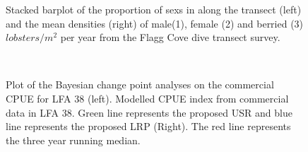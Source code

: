 \documentclass[11pt]{article}
\newcommand{\e}{\string~/bio.data/bio.lobster/figures/LFA3438Framework2019/} %
\begin{document}
\begin{landscape}
\begin{figure}
    \centering

       \caption{Stacked barplot of the proportion of sexs in along the transect (left) and the mean densities (right) of male(1), female (2) and berried (3) $lobsters/m^2$ per year from the Flagg Cove dive transect survey.}

    \end{figure}


\begin{figure}
        \centering
                \\

\caption{Plot of the Bayesian change point analyses on the commercial CPUE for LFA 38 (left). Modelled CPUE index from commercial data in LFA 38. Green line represents the proposed USR and blue line represents the proposed LRP (Right). The red line represents the three year running median.  }
        \end{figure}
\end{landscape}
\end{document}
